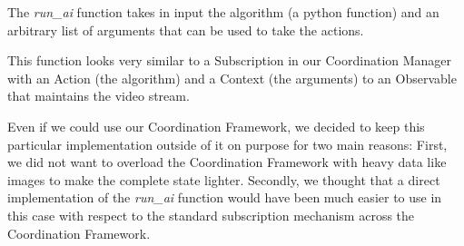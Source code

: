 The \textit{run\_ai} function takes in input the algorithm (a python function) and an arbitrary list of arguments that can be used to take the actions.

This function looks very similar to a Subscription in our Coordination Manager with an Action (the algorithm) and a Context (the arguments) to an Observable that maintains the video stream.

Even if we could use our Coordination Framework, we decided to keep this particular implementation outside of it on purpose for two main reasons:
First, we did not want to overload the Coordination Framework with heavy data like images to make the complete state lighter.
Secondly, we thought that a direct implementation of the \textit{run\_ai} function would have been much easier to use in this case with respect to the standard subscription mechanism across the Coordination Framework.
